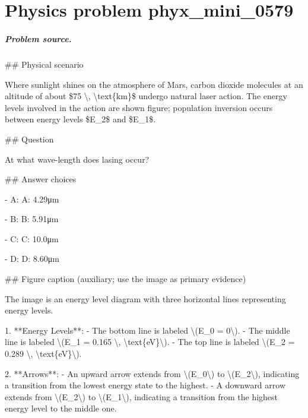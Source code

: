 
\chapter{Physics problem phyx\_mini\_0579}
\label{ch:PhyXMiniProblems_problem_phyx_mini_0579}

\paragraph{Problem source.}
\#\# Physical scenario

Where sunlight shines on the atmosphere of Mars, carbon dioxide molecules at an altitude of about \$75 \textbackslash{}, \textbackslash{}text\{km\}\$ undergo natural laser action. The energy levels involved in the action are shown figure; population inversion occurs between energy levels \$E\_2\$ and \$E\_1\$.

\#\# Question

At what wave-length does lasing occur?

\#\# Answer choices

- A: A: 4.29μm

- B: B: 5.91μm

- C: C: 10.0μm

- D: D: 8.60μm

\#\# Figure caption (auxiliary; use the image as primary evidence)

The image is an energy level diagram with three horizontal lines representing energy levels. 

1. **Energy Levels**:
   - The bottom line is labeled \textbackslash{}(E\_0 = 0\textbackslash{}).
   - The middle line is labeled \textbackslash{}(E\_1 = 0.165 \textbackslash{}, \textbackslash{}text\{eV\}\textbackslash{}).
   - The top line is labeled \textbackslash{}(E\_2 = 0.289 \textbackslash{}, \textbackslash{}text\{eV\}\textbackslash{}).

2. **Arrows**:
   - An upward arrow extends from \textbackslash{}(E\_0\textbackslash{}) to \textbackslash{}(E\_2\textbackslash{}), indicating a transition from the lowest energy state to the highest.
   - A downward arrow extends from \textbackslash{}(E\_2\textbackslash{}) to \textbackslash{}(E\_1\textbackslash{}), indicating a transition from the highest energy level to the middle one.

